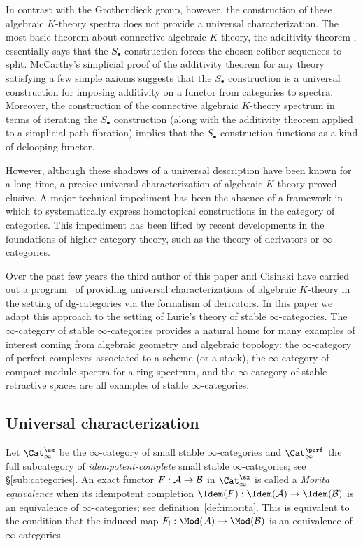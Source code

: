 \documentclass{amsart}
\newcommand{\ssdot}{\bullet}%
\newcommand{\Sdot}[1][\ssdot]{S_{#1}}
\renewcommand{\to}{\mathchoice{\longrightarrow}{\rightarrow}{\rightarrow}{\rightarrow}}
\newcommand{\cA}{{\mathcal A}}
\newcommand{\cB}{{\mathcal B}}
\let\catsymbfont\mathcal
\newcommand{\aA}{{\catsymbfont{A}}}
\newcommand{\aB}{{\catsymbfont{B}}}
\newcommand{\stabcat}{\Cat_\i^{\ex}}
\newcommand{\idemstabcat}{\Cat_\i^{\perf}}
\renewcommand{\i}{\infty}
\numberwithin{equation}{section}
\theoremstyle{definition}
\begin{document}
In contrast with the Grothendieck group, however, the construction
of these algebraic $K$-theory spectra does not provide a universal
characterization.
The most basic theorem about connective algebraic $K$-theory, the
additivity theorem \cite{Wald}, essentially says that the
$\Sdot$ construction forces the chosen cofiber sequences to split.
McCarthy's simplicial proof of the additivity theorem \cite{McCarthy2}
for any theory satisfying a few simple axioms suggests that the
$\Sdot$ construction is a universal construction for imposing
additivity on a functor from categories to spectra.  Moreover, the
construction of the connective algebraic $K$-theory spectrum
in terms of iterating the $\Sdot$ construction (along with the
additivity theorem applied to a simplicial path fibration) implies
that the $\Sdot$ construction functions as a kind of delooping
functor.

However, although these shadows of a universal description have been
known for a long time, a precise universal characterization of
algebraic $K$-theory proved elusive.  A major technical impediment has
been the absence of a framework in which to systematically express
homotopical constructions in the category of categories.  This
impediment has been lifted by recent
developments in the foundations of higher category theory, such as the theory of
derivators or $\i$-categories.

Over the past few years the third author of this paper and Cisinski
have carried out a program~\cite{CisTab0,CisTab, Duke} of
providing universal characterizations of algebraic $K$-theory in the
setting of dg-categories via the formalism of derivators.  In this
paper we adapt this approach to the setting of Lurie's 
theory of stable $\i$-categories.  The $\i$-category of stable
$\i$-categories provides a natural home for many examples of
interest coming from algebraic geometry and algebraic topology: the
$\i$-category of perfect complexes associated to a scheme (or a
stack), the $\i$-category of compact module spectra for a
ring spectrum, and the $\i$-category of stable retractive spaces are
all examples of stable $\i$-categories.

\subsection{Universal characterization}
Let $\stabcat$ be the $\i$-category of small stable $\i$-categories
and $\idemstabcat$ the full subcategory of {\em idempotent-complete}
small stable $\i$-categories; see \S\ref{sub:categories}. An exact
functor $F: \cA \to \cB$ in $\stabcat$ is called a {\em Morita
equivalence} when its idempotent completion
$\Idem(F): \Idem(\cA) \to \Idem(\cB)$ is an equivalence of
$\i$-categories; see definition~\ref{def:imorita}.  This is equivalent
to the condition that the induced map $F_!:\Mod(\aA)\to\Mod(\aB)$ is an equivalence of $\i$-categories.
\end{document}
